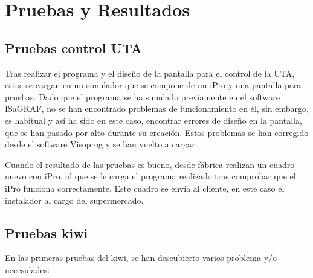 
\cleardoublepage
\chapter{Pruebas y Resultados}

\label{chap:resultados} %


\section{Pruebas control UTA}
\label{sec:pruebasUTA}

Tras realizar el programa y el diseño de la pantalla para el control de la UTA, estos se cargan en un simulador que se compone de un iPro y una pantalla para pruebas. Dado que el programa se ha simulado previamente en el software ISaGRAF, no se han encontrado problemas de funcionamiento en él, sin embargo, es habitual y así ha sido en este caso, encontrar errores de diseño en la pantalla, que se han pasado por alto durante su creación. Estos problemas se han corregido desde el software Visoprog y se han vuelto a cargar.

Cuando el resultado de las pruebas es bueno, desde fábrica realizan un cuadro nuevo con iPro, al que se le carga el programa realizado tras comprobar que el iPro funciona correctamente. Este cuadro se envía al cliente, en este caso el instalador al cargo del supermercado.


\section{Pruebas kiwi}
\label{sec:pruebasKiwi}

En las primeras pruebas del kiwi, se han descubierto varios problema y/o necesidades:

